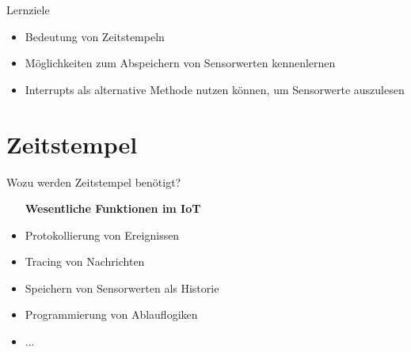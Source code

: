 \begin{frame}{Lernziele}
    \begin{itemize}
       \item  Bedeutung von Zeitstempeln
        \item Möglichkeiten zum Abspeichern von Sensorwerten kennenlernen       
        \item Interrupts als alternative Methode nutzen können, um Sensorwerte auszulesen
    \end{itemize}
\end{frame}
 
 
\section{Zeitstempel}

\begin{frame}{Wozu werden Zeitstempel benötigt?}
    \begin{itemize}
        \setlength{\itemindent}{1.9in}
        \item [\textbf{Wesentliche Funktionen im IoT}]
    \end{itemize}

    \begin{itemize}
        \item Protokollierung von Ereignissen
        \item Tracing von Nachrichten
        \item Speichern von Sensorwerten als Historie
        \item Programmierung von Ablauflogiken
        \item ...
     \end{itemize}
\end{frame}


